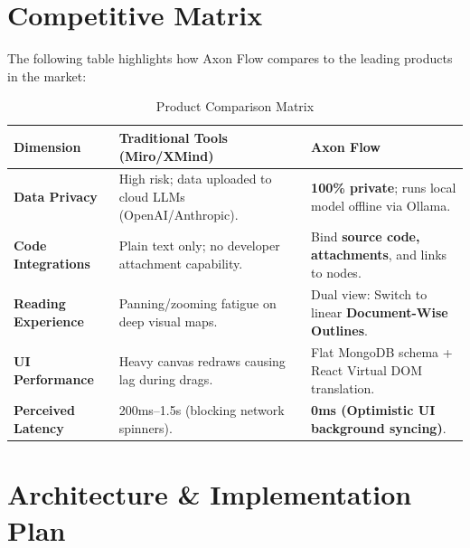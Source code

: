 \documentclass[12pt, a4paper]{article}
\begin{document}
\newpage

\section{Competitive Matrix}

The following table highlights how Axon Flow compares to the leading products in the market:

\begin{table}[H]
  \centering
  \small
  \renewcommand{\arraystretch}{1.3}
  \begin{tabularx}{\textwidth}{l >{\raggedright\arraybackslash}X >{\raggedright\arraybackslash}X}
    \toprule
    \textbf{Dimension} & \textbf{Traditional Tools (Miro/XMind)} & \textbf{Axon Flow} \\
    \midrule
    \rowcolor{axonpurple!5}
    \textbf{Data Privacy} & High risk; data uploaded to cloud LLMs (OpenAI/Anthropic). & \textbf{100\% private}; runs local model offline via Ollama. \\
    
    \textbf{Code Integrations} & Plain text only; no developer attachment capability. & Bind \textbf{source code, attachments}, and links to nodes. \\
    
    \rowcolor{axonpurple!5}
    \textbf{Reading Experience} & Panning/zooming fatigue on deep visual maps. & Dual view: Switch to linear \textbf{Document-Wise Outlines}. \\
    
    \textbf{UI Performance} & Heavy canvas redraws causing lag during drags. & Flat MongoDB schema + React Virtual DOM translation. \\
    
    \rowcolor{axonpurple!5}
    \textbf{Perceived Latency} & 200ms--1.5s (blocking network spinners). & \textbf{0ms (Optimistic UI background syncing)}. \\
    \bottomrule
  \end{tabularx}
  \caption{Product Comparison Matrix}
  \label{tab:comparison}
\end{table}

\section{Architecture \& Implementation Plan}
\end{document}
